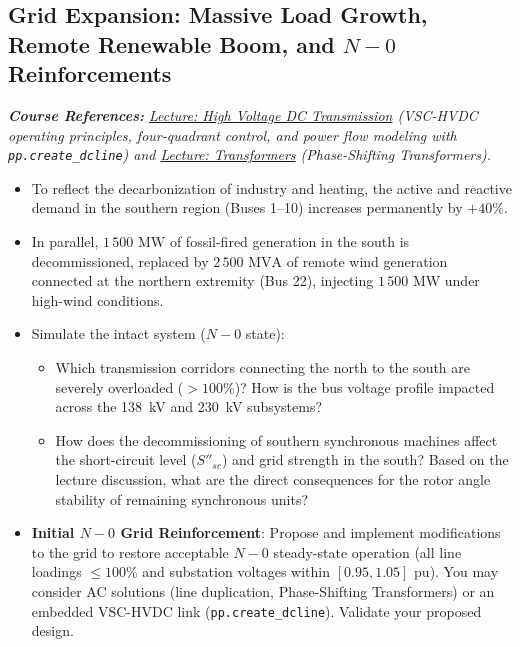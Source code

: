 \documentclass[11pt]{article}
\begin{document}
  \subsection{Grid Expansion: Massive Load Growth, Remote Renewable Boom, and $N-0$ Reinforcements}
  \label{sec:grid_expansion}
  \noindent\textit{\textbf{Course References:} \href{https://github.com/bcornelusse/ELEC0447-analysis-power-systems/blob/master/Lectures/HVDC/main.pdf}{Lecture: High Voltage DC Transmission} (VSC-HVDC operating principles, four-quadrant control, and power flow modeling with \lstinline|pp.create_dcline|) and \href{https://github.com/bcornelusse/ELEC0447-analysis-power-systems/blob/master/Lectures/TransfomerAndPF/main.pdf}{Lecture: Transformers} (Phase-Shifting Transformers).}
  \vspace{1mm}
  \begin{itemize}
    \item To reflect the decarbonization of industry and heating, the active and reactive demand in the southern region (Buses 1--10) increases permanently by \textbf{$+40\%$}.
    \item In parallel, $1\,500\text{ MW}$ of fossil-fired generation in the south is decommissioned, replaced by $2\,500\text{ MVA}$ of remote wind generation connected at the northern extremity (Bus 22), injecting $1\,500\text{ MW}$ under high-wind conditions.
    \item Simulate the intact system ($N-0$ state):
    \begin{itemize}
      \item Which transmission corridors connecting the north to the south are severely overloaded ($>100\%$)? How is the bus voltage profile impacted across the 138~kV and 230~kV subsystems?
      \item How does the decommissioning of southern synchronous machines affect the short-circuit level ($S''_{sc}$) and grid strength in the south? Based on the lecture discussion, what are the direct consequences for the rotor angle stability of remaining synchronous units?
    \end{itemize}
    \item \textbf{Initial $N-0$ Grid Reinforcement}: Propose and implement modifications to the grid to restore acceptable $N-0$ steady-state operation (all line loadings $\le 100\%$ and substation voltages within $[0.95, 1.05]\text{ pu}$). You may consider AC solutions (line duplication, Phase-Shifting Transformers) or an embedded VSC-HVDC link (\lstinline|pp.create_dcline|). Validate your proposed design.
  \end{itemize}
\end{document}
